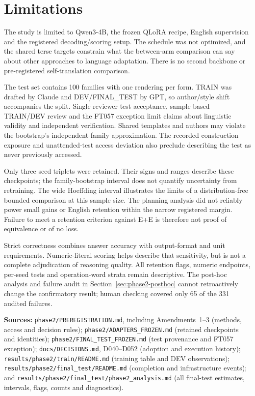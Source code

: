 \section{Limitations}
\label{sec:phase2-limitations}
The study is limited to Qwen3-4B, the frozen QLoRA recipe, English supervision and the registered decoding/scoring setup. The schedule was not optimized, and the shared terse targets constrain what the between-arm comparison can say about other approaches to language adaptation. There is no second backbone or pre-registered self-translation comparison.

The test set contains 100 families with one rendering per form. TRAIN was drafted by Claude and DEV/FINAL\_TEST by GPT, so author/style shift accompanies the split. Single-reviewer test acceptance, sample-based TRAIN/DEV review and the FT057 exception limit claims about linguistic validity and independent verification. Shared templates and authors may violate the bootstrap's independent-family approximation. The recorded construction exposure and unattended-test access deviation also preclude describing the test as never previously accessed.

Only three seed triplets were retained. Their signs and ranges describe these checkpoints; the family-bootstrap interval does not quantify uncertainty from retraining. The wide Hoeffding interval illustrates the limits of a distribution-free bounded comparison at this sample size. The planning analysis did not reliably power small gains or English retention within the narrow registered margin. Failure to meet a retention criterion against E+E is therefore not proof of equivalence or of no loss.

Strict correctness combines answer accuracy with output-format and unit requirements. Numeric-literal scoring helps describe that sensitivity, but is not a complete adjudication of reasoning quality. All retention flags, numeric endpoints, per-seed tests and operation-word strata remain descriptive. The post-hoc analysis and failure audit in Section~\ref{sec:phase2-posthoc} cannot retroactively change the confirmatory result; human checking covered only 65 of the 331 audited failures.

\begingroup\small\singlespacing
\noindent\textbf{Sources:} \nolinkurl{phase2/PREREGISTRATION.md}, including Amendments~1--3 (methods, access and decision rules); \nolinkurl{phase2/ADAPTERS_FROZEN.md} (retained checkpoints and identities); \nolinkurl{phase2/FINAL_TEST_FROZEN.md} (test provenance and FT057 exception); \nolinkurl{docs/DECISIONS.md}, D040--D052 (adoption and execution history); \nolinkurl{results/phase2/train/README.md} (training table and DEV observations); \nolinkurl{results/phase2/final_test/README.md} (completion and infrastructure events); and \nolinkurl{results/phase2/final_test/phase2_analysis.md} (all final-test estimates, intervals, flags, counts and diagnostics).\par
\endgroup
